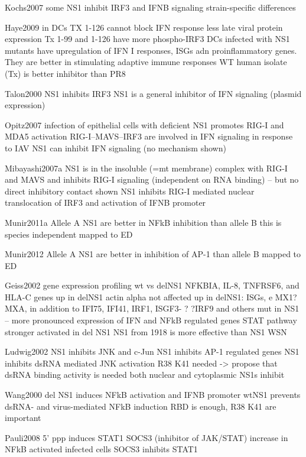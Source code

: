 
		Kochs2007
		some NS1 inhibit IRF3 and IFNB signaling
		strain-specific differences
		
		Haye2009
		in DCs
		TX 1-126 cannot block IFN response
		less late viral protein expression
		Tx 1-99 and 1-126 have more phospho-IRF3
		DCs infected with NS1 mutants have upregulation of IFN I responses, ISGs adn proinflammatory genes. They are better in stimulating adaptive immune responses
		WT human isolate (Tx) is better inhibitor than PR8
		
		Talon2000
		NS1 inhibits IRF3 
		NS1 is a general inhibitor of IFN signaling (plasmid expression)
		
		Opitz2007
		infection of epithelial cells with deficient NS1 promotes RIG-I and MDA5 activation
		RIG-I--MAVS--IRF3 are involved in IFN signaling in response to IAV
		NS1 can inhibit IFN signaling (no mechanism shown)
		
		Mibayashi2007a
		NS1 is in the insoluble (=mt membrane) complex with RIG-I and MAVS and inhibits RIG-I signaling (independent on RNA binding) -- but no direct inhibitory contact shown
		NS1 inhibits RIG-I mediated nuclear translocation of IRF3 and activation of IFNB promoter
		
		Munir2011a
		Allele A NS1 are better in NFkB inhibition than allele B
		this is species independent
		mapped to ED 
		
		Munir2012
		Allele A NS1 are better in inhibition of AP-1 than allele B
		mapped to ED
		
		Geiss2002
		gene expression profiling wt vs delNS1
		NFKBIA, IL-8, TNFRSF6, and HLA-C genes up in delNS1
		actin alpha not affected
		up in delNS1: ISGs, e MX1?MXA, in addition to IFI75, IFI41, IRF1, ISGF3-
		? ?IRF9 and others
		mut in NS1 -- more pronounced expression of IFN and NFkB regulated genes
		STAT pathway stronger activated in del NS1
		NS1 from 1918 is more effective than NS1 WSN
		
		Ludwig2002
		NS1 inhibits JNK and c-Jun
		NS1 inhibits AP-1 regulated genes
		NS1 inhibits dsRNA mediated JNK activation
		R38 K41 needed -> propose that dsRNA binding activity is needed
		both nuclear and cytoplasmic NS1s inhibit
		
		Wang2000
		del NS1 induces NFkB activation and IFNB promoter
		wtNS1 prevents dsRNA- and virus-mediated NFkB induction
		RBD is enough, R38 K41 are important
	
		
		Pauli2008
		5' ppp induces STAT1
		SOCS3 (inhibitor of JAK/STAT) increase in NFkB activated infected cells
		SOCS3 inhibits STAT1
		

